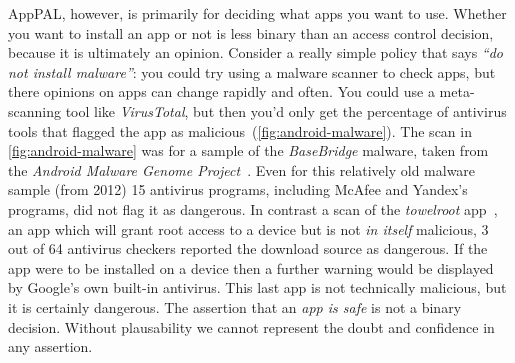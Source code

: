 \documentclass[thesis.tex]{subfiles}
\begin{document}
AppPAL, however, is primarily for deciding what apps you want to use.
Whether you want to install an app or not is less binary than an
access control decision, because it is ultimately an opinion.
Consider a really simple policy that says \emph{``do not install
malware''}: you could try using a malware scanner to check apps, but
there opinions on apps can change rapidly and often.  You could use a
meta-scanning tool like \emph{VirusTotal}, but then you'd only get the
percentage of antivirus tools that flagged the app as
malicious~(\autoref{fig:android-malware}).  The scan in
\autoref{fig:android-malware} was for a sample of the
\emph{BaseBridge} malware, taken from the \emph{Android Malware Genome
Project}~\cite{zhou_dissecting_2012}.  Even for this relatively old
malware sample (from 2012) 15 antivirus programs, including McAfee and
Yandex's programs, did not flag it as dangerous.  In contrast a scan
of the \emph{towelroot}
app~\cite{george_geohot_hotz_towelroot_nodate}, an app which will
grant root access to a device but is not \emph{in itself} malicious, 3
out of 64 antivirus checkers reported the download source as
dangerous.  If the app were to be installed on a device then a further
warning would be displayed by Google's own built-in antivirus.  This
last app is not technically malicious, but it is certainly dangerous.
The assertion that an \emph{app is safe} is not a binary decision.
Without plausability we cannot represent the doubt and confidence in
any assertion.
\end{document}
